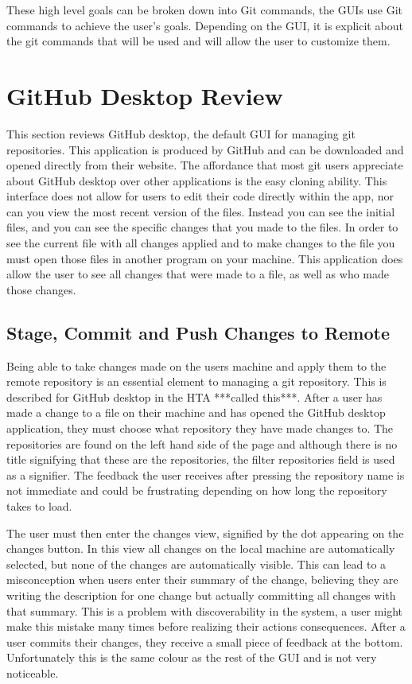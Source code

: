 \documentclass{sigchi}
\begin{document}
 These high level goals can be broken down into Git commands, the GUIs use Git commands to achieve the user's goals. Depending on the GUI,
it is explicit about the git commands that will be used and will allow the user to customize them. 

\section{GitHub Desktop Review}
This section reviews GitHub desktop, the default GUI for managing git repositories.
This application is produced by GitHub and can be downloaded and opened directly from 
their website. The affordance that most git users appreciate about GitHub desktop over 
other applications is the easy cloning ability. This interface does not allow for users 
to edit their code directly within the app, nor can you view the most recent version of 
the files. Instead you can see the initial files, and you can see the specific changes
that you made to the files. In order to see the current file with all changes applied
and to make changes to the file you must open those files in another program on your 
machine. This application does allow the user to see all changes that were made to a file, 
as well as who made those changes.
 
\subsection{Stage, Commit and Push Changes to Remote}
Being able to take changes made on the users machine and apply them to the remote repository 
is an essential element to managing a git repository. This is described for GitHub desktop in
the HTA ***called this***. After a user has made a change to a file on their machine and has 
opened the GitHub desktop application, they must choose what repository they have made changes 
to. The repositories are found on the left hand side of the page and although there is no title 
signifying that these are the repositories, the filter repositories field is used as a signifier.
The feedback the user receives after pressing the repository name is not immediate and could be
frustrating depending on how long the repository takes to load. 

The user must then enter the changes view, signified by the dot appearing on the changes 
button. In this view all changes on the local machine are automatically selected, but none of the 
changes are automatically visible. This can lead to a misconception when users enter their summary
of the change, believing they are writing the description for one change but actually committing 
all changes with that summary. This is a problem with discoverability in the system, a user might 
make this mistake many times before realizing their actions consequences. After a user commits their 
changes, they receive a small piece of feedback at the bottom. Unfortunately this is the same colour 
as the rest of the GUI and is not very noticeable.
\end{document}
